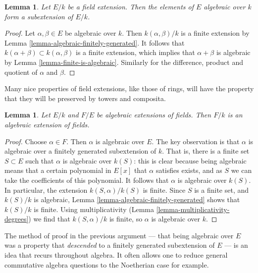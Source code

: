 \documentclass{stacks-project}
\theoremstyle{plain}
\newtheorem{lemma}[subsection]{Lemma}
\theoremstyle{definition}
\theoremstyle{remark}
\numberwithin{equation}{subsection}
\begin{document}
\begin{lemma}
\label{lemma-algebraic-elements}
Let $E/k$ be a field extension. Then the elements of $E$ algebraic over $k$
form a subextension of $E/k$.
\end{lemma}

\begin{proof}
Let $\alpha, \beta \in E$ be algebraic over $k$. Then $k(\alpha, \beta)/k$
is a finite extension by Lemma \ref{lemma-algebraic-finitely-generated}.
It follows that $k(\alpha + \beta) \subset k(\alpha, \beta)$ is a finite
extension, which implies that $\alpha + \beta$ is algebraic by
Lemma \ref{lemma-finite-is-algebraic}. Similarly for the difference,
product and quotient of $\alpha$ and $\beta$.
\end{proof}

\noindent
Many nice properties of field extensions, like those of rings, will have the
property that they will be preserved by towers and composita.

\begin{lemma}
\label{lemma-algebraic-permanence}
Let $E/k$ and $F/E$ be algebraic extensions of fields. Then $F/k$ is an
algebraic extension of fields.
\end{lemma}

\begin{proof}
Choose $\alpha \in F$. Then $\alpha$ is algebraic over $E$.
The key observation is that $\alpha$ is algebraic over a
finitely generated subextension of $k$.
That is, there is a finite set $S \subset E$ such that $\alpha $ is algebraic
over $k(S)$: this is clear because being algebraic means that a certain
polynomial in $E[x]$ that $\alpha$ satisfies exists, and as $S$ we can take the
coefficients of this polynomial. It follows that $\alpha$ is algebraic over
$k(S)$. In particular, the extension $k(S, \alpha)/ k(S)$ is finite.
Since $S$ is a finite set, and $k(S)/k$ is algebraic,
Lemma \ref{lemma-algebraic-finitely-generated} shows that
$k(S)/k$ is finite. Using multiplicativity
(Lemma \ref{lemma-multiplicativity-degrees})
we find that $k(S,\alpha)/k$ is finite, so $\alpha$ is algebraic over $k$.
\end{proof}

\noindent
The method of proof in the previous argument --- that being algebraic
over $E$ was a property that {\it descended} to a finitely generated
subextension of $E$ --- is an idea that recurs throughout algebra.
It often allows one to reduce general commutative algebra questions
to the Noetherian case for example.
\end{document}
